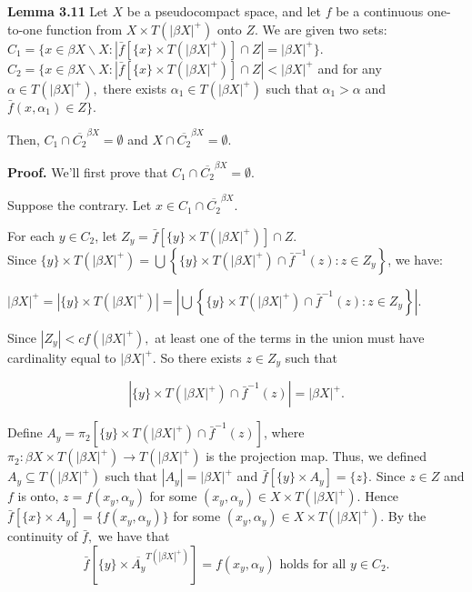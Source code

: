 \documentclass{article}
\begin{document}
\textbf{Lemma 3.11} Let $X$ be a pseudocompact space, and let $f$ be a continuous one-to-one function from $X\times T(|\beta X|^+)$ onto $Z$. We are given two sets: \\
$C_1=\{x\in \beta X\backslash X: \left|\bar{f}[\{x\}\times T(|\beta X|^+)]\cap Z\right|=|\beta X|^+\}.$\\
$C_2=\{x\in \beta X\backslash X: \left|\bar{f}[\{x\}\times T(|\beta X|^+)]\cap Z\right|<|\beta X|^+ $ and for any $\alpha\in T(|\beta X|^+),$ there exists $\alpha_1\in T(|\beta X|^+)$ such that $\alpha_1 >\alpha$ and $\bar{f}(x,\alpha_1) \in Z \}.$

Then, $C_1\cap \overline{C_2}^{\beta X}=\emptyset$ and $X\cap \overline{C_2}^{\beta X}=\emptyset$.

\vskip 15pt

\textbf{Proof.} We'll first prove that $C_1\cap \overline{C_2}^{\beta X}=\emptyset$. 

\vskip 5pt
Suppose the contrary. Let $x\in C_1\cap \overline{C_2}^{\beta X}$. 

\vskip 10pt



For each $y\in C_2$, let $Z_y=\bar{f}\left[\{y\}\times T(|\beta X|^+)\right] \cap Z$. \\
Since $\{y\}\times T(|\beta X|^+) = \bigcup \left\{ \{y\} \times T(|\beta X|^+) \cap \bar{f}^{-1}(z):z\in Z_y \right\}$, we have:
\begin{center}
$\left|\beta X\right|^+ =\left| \{y\}\times T(|\beta X|^+)\right| = \left| \bigcup \left\{ \{y\} \times T(|\beta X|^+) \cap \bar{f}^{-1}(z):z\in Z_y \right\}\right|.$
\end{center}
 Since $\left|Z_y\right|< cf(\left|\beta X\right|^+),$ at least one of the terms in the union must have cardinality equal to $\left|\beta X\right|^+$. So there exists $z\in Z_y$ such that 
 
 $$\left|  \{y\} \times T(|\beta X|^+) \cap \bar{f}^{-1}(z) \right|=\left|\beta X\right|^+.$$ 
 
\vskip 15pt
 
Define $A_y=\pi_2 \left[ \{y\} \times T(|\beta X|^+) \cap \bar{f}^{-1}(z) \right]$, where $\pi_2: \beta X \times 
T(|\beta X|^+) \rightarrow T(|\beta X|^+)$ is the projection map. Thus, we defined $A_y\subseteq T(\left|\beta X\right|^+)$ such that $\left|A_y\right|=\left|\beta X\right|^+$ and $\bar{f}[\{y\}\times A_y]=\{z\}.$ Since $z\in Z$ and $f$ is onto, $z=f(x_y,\alpha_y)$ for some $(x_y,\alpha_y)\in X\times T(|\beta X|^+).$ Hence $\bar{f}\left[\{x\}\times A_y\right]=\{f(x_y,\alpha_y)\}$ for some $(x_y, \alpha_y)\in X\times T(|\beta X|^+).$ By the continuity of $\bar{f},$ we have that $$\bar{f}\left[\{y\}\times \overline{A_y}^{T(|\beta X|^+)}\right]=f(x_y,\alpha_y) \mbox{ holds for all } y \in C_2.$$
\end{document}
